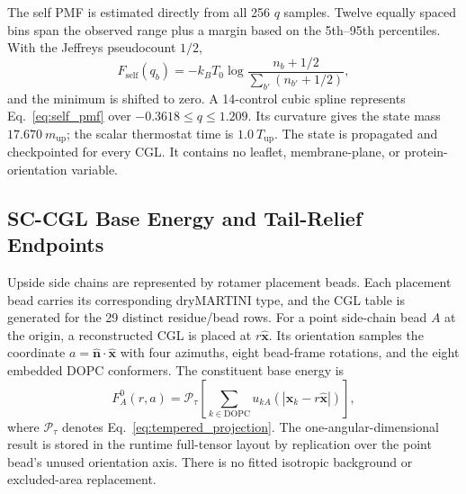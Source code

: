 \documentclass{article}
\begin{document}
The self PMF is estimated directly from all 256 $q$ samples.  Twelve equally
spaced bins span the observed range plus a margin based on the 5th--95th
percentiles.  With the Jeffreys pseudocount $1/2$,
\begin{equation}
F_{\mathrm{self}}(q_b)=-k_BT_0\log
\frac{n_b+1/2}{\sum_{b'}(n_{b'}+1/2)},
\label{eq:self_pmf}
\end{equation}
and the minimum is shifted to zero.  A 14-control cubic spline represents
Eq.~\ref{eq:self_pmf} over $-0.3618\leq q\leq1.209$.  Its curvature gives the
state mass $17.670~m_{\mathrm{up}}$; the scalar thermostat time is
$1.0~T_{\mathrm{up}}$.  The state is propagated and checkpointed for every
CGL.  It contains no leaflet, membrane-plane, or protein-orientation variable.

\subsection{SC-CGL Base Energy and Tail-Relief Endpoints}

Upside side chains are represented by rotamer placement beads.  Each placement
bead carries its corresponding dryMARTINI type, and the CGL table is generated
for the 29 distinct residue/bead rows.  For a point side-chain bead $A$ at the
origin, a reconstructed CGL is placed at $r\hat{\mathbf x}$.  Its orientation
samples the coordinate $a=\hat{\mathbf n}\cdot\hat{\mathbf x}$ with four
azimuths, eight bead-frame rotations, and the eight embedded DOPC conformers.
The constituent base energy is
\begin{equation}
F_A^0(r,a)=\mathcal P_{\tau}
\left[\sum_{k\in\mathrm{DOPC}}u_{kA}
\left(|\mathbf x_k-r\hat{\mathbf x}|\right)\right],
\label{eq:sc_base}
\end{equation}
where $\mathcal P_{\tau}$ denotes Eq.~\ref{eq:tempered_projection}.  The
one-angular-dimensional result is stored in the runtime full-tensor layout by
replication over the point bead's unused orientation axis.  There is no fitted
isotropic background or excluded-area replacement.
\end{document}
